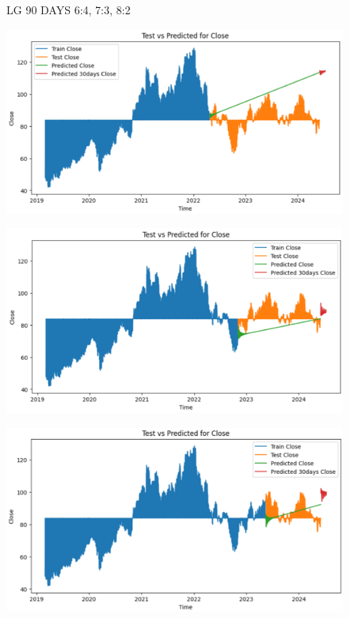 \documentclass{article}
\begin{document}
\begin{multicols}{2}
\begin{figure}[H]
\begin{minipage}{0.15\textwidth}
    \label{fig:3}
    \end{minipage}
    \caption{LG 90 DAYS  6:4, 7:3, 8:2 }
\end{figure}

\begin{figure}[H]
    \centering
    \begin{minipage}{0.15\textwidth}
    \centering
    \includegraphics[width=1\textwidth]{Image/VARMA/SONY/6_4/30.png}
   
    \label{fig:1}
    \end{minipage}%
    \begin{minipage}{0.15\textwidth}
    \centering
    \includegraphics[width=1\textwidth]{Image/VARMA/SONY/7_3/30.png}
  
    \label{fig:2}
    \end{minipage}%
    \begin{minipage}{0.15\textwidth}
    \centering
    \includegraphics[width=1\textwidth]{Image/VARMA/SONY/8_2/30.png}


\end{minipage}
\end{figure}
\end{multicols}
\end{document}
